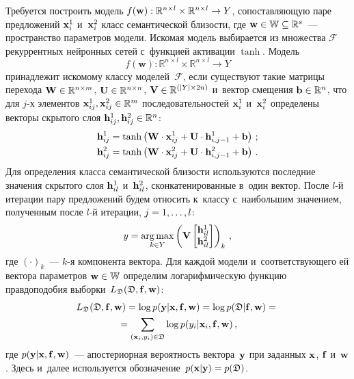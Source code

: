 \begin{multicols}{2}
Требуется построить модель $f(\mathbf{w}): \mathbb{R}^{n\times l} 
\hm\times \mathbb{R}^{n\times l} \hm\to 
Y$, сопоставляющую паре предложений ${\mathbf{x}}_i^1$ и~${\mathbf{x}}_i^2$ класс семантической 
близости, где $\mathbf{w} \hm\in \mathbb{W}\subseteq\mathbb{R}^s$~--- пространство параметров модели.
Искомая модель выбирается из множества $\mathcal{F}$ рекуррентных нейронных сетей 
с~функцией активации $\tanh$. Модель
\[
f(\mathbf{w}): \mathbb{R}^{n\times l} \times \mathbb{R}^{n\times l} \to Y
\]
принадлежит искомому классу моделей~$\mathcal{F}$, если существуют такие матрицы 
перехода $\bW\hm\in \mathbb{R}^{n\times m}$, 
$\bU\hm\in \mathbb{R}^{n\times n}$, $\bV\hm\in \mathbb{R}^{(|Y| 
\times 2n)}$ и~вектор смещения $\bb \hm\in \mathbb{R}^{n}$, что для $j$-х элементов 
$\bx_{ij}^1, \bx_{ij}^2 \hm\in \mathbb{R}^m$ последовательностей ${\mathbf{x}}_i^1$ и~${\mathbf{x}}_i^2$ 
определены векторы скрытого слоя $\bh_{ij}^1, \bh_{ij}^2 \hm\in \mathbb{R}^{n}$:
\begin{align*}
{\mathbf{h}}_{ij}^1 &= \tanh\left({\mathbf{W}}\cdot {\mathbf{x}}_{ij}^1 + {\mathbf{U}}\cdot {\mathbf{h}}_{i,j-1}^1 + {\mathbf{b}}\right)\,;\\
{\mathbf{h}}_{ij}^2 &= \tanh\left({\mathbf{W}}\cdot {\mathbf{x}}_{ij}^2 + {\mathbf{U}}\cdot {\mathbf{h}}_{i,j-1}^2 + {\mathbf{b}}\right)\,.
\end{align*}
Для определения класса семантической близости используются последние значения 
скрытого слоя ${\mathbf{h}}_{il}^1$ и~${\mathbf{h}}_{il}^2$, сконкатенированные в~один вектор. 
После $l$-й итерации
пару предложений будем относить к~классу с~наибольшим значением, полученным 
после $l$-й итерации, $j\hm=1,\dots,l$:
\begin{equation*}
y = \argmax_{k\in Y}
\left(\bV%
\begin{bmatrix}
\bh_{il}^1\\
\bh_{il}^2
\end{bmatrix}\right)_k\,,
\end{equation*}
где $(\cdot)_k$~--- $k$-я компонента вектора. Для каждой модели 
и~соответствующего ей вектора па\-ра\-мет\-ров $\mathbf{w} \hm\in \mathbb{W}$ определим логарифмическую 
функцию правдоподобия выборки~$L_\mathfrak{D}(\mathfrak{D},{\mathbf{f}},\mathbf{w})$:
\begin{multline}
L_\mathfrak{D}(\mathfrak{D}, {\mathbf{f}},\mathbf{w}) = 
\log p({\mathbf{y}}|{\mathbf{x}},{\mathbf{f}},\mathbf{w}) = \log p(\mathfrak{D}|{\mathbf{f}},\mathbf{w}) = {}\\
{}=
\sum\limits_{({\mathbf{x}}_i,y_i)\in\mathfrak{D}} \log p(y_i|{\mathbf{x}}_i,{\mathbf{f}},\mathbf{w}) \,,
\label{L^N}
\end{multline}
где $p({\mathbf{y}}|{\mathbf{x}},{\mathbf{f}},\mathbf{w})$~--- апостериорная вероятность вектора~${\mathbf{y}}$ при 
заданных ${\mathbf{x}}$, ${\mathbf{f}}$ и~$\mathbf{w}$.
Здесь и~далее используется обозначение~$p(\bx|\by)\hm = p(\mathfrak{D})$.


\end{multicols}

